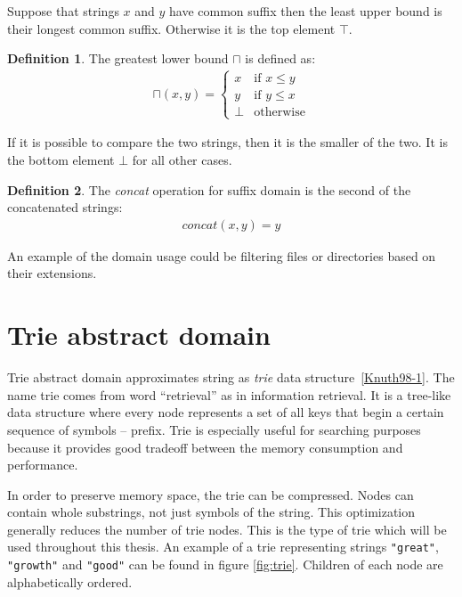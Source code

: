 \documentclass[12pt,final,oneside]{fithesis2}
\theoremstyle{definition}
\newtheorem{definition}{Definition}[chapter]
\begin{document}
Suppose that strings $x$ and $y$ have common suffix then the least
upper bound is their longest common suffix. Otherwise it is the top
element $\top$.

\begin{definition}
\label{def:suffixmeet}
The greatest lower bound $\sqcap$ is defined as:
\begin{align*}
\sqcap (x, y) =
\begin{cases}
x    & \text{if } x \leq y \\
y    & \text{if } y \leq x \\
\bot & \text{otherwise}
\end{cases}
\end{align*}
\end{definition}

If it is possible to compare the two strings, then it is the smaller of the
two. It is the bottom element $\bot$ for all other cases.

\begin{definition}
\label{def:suffixstrcat}
The \textit{concat} operation for suffix domain is the second of the
concatenated strings:
\begin{align*}
\textit{concat}(x, y) = y
\end{align*}
\end{definition}

An example of the domain usage could be filtering files or directories
based on their extensions.


\section{Trie abstract domain}

Trie abstract domain approximates string as \textit{trie} data structure~\ref{Knuth98-1}.
The name trie comes from word ``retrieval'' as in information retrieval. It
is a tree-like data structure where every node represents a set of all keys
that begin a certain sequence of symbols -- prefix. Trie is especially useful
for searching purposes because it provides good tradeoff between the memory
consumption and performance.

In order to preserve memory space, the trie can be compressed. Nodes can
contain whole substrings, not just symbols of the string. This optimization
generally reduces the number of trie nodes. This is the type of
trie which will be used throughout this thesis. An example of a trie
representing strings \texttt{"great"}, \texttt{"growth"} and \texttt{"good"}
can be found in figure \ref{fig:trie}. Children of each node are
alphabetically ordered.
\end{document}
